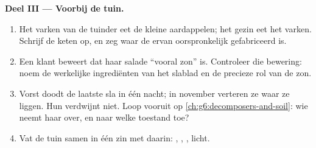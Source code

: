 \begin{problem}
\medskip\noindent\textbf{Deel III --- Voorbij de tuin.}
\begin{enumerate}[resume]
  \item Het varken van de tuinder eet de kleine aardappelen; het gezin
        eet het varken. Schrijf de keten op, en zeg waar de  ervan oorspronkelijk gefabriceerd is.
  \item Een klant beweert dat haar salade ``vooral zon'' is. Controleer
        die bewering: noem de werkelijke ingrediënten van het slablad en
        de precieze rol van de zon.
  \item Vorst doodt de laatste sla in één nacht; in november verteren ze
        waar ze liggen. Hun  verdwijnt niet. Loop
        vooruit op \cref{ch:g6:decomposers-and-soil}: wie neemt haar
        over, en naar welke toestand toe?
  \item Vat de tuin samen in één zin met daarin: , , , licht.
\end{enumerate}
\end{problem}
